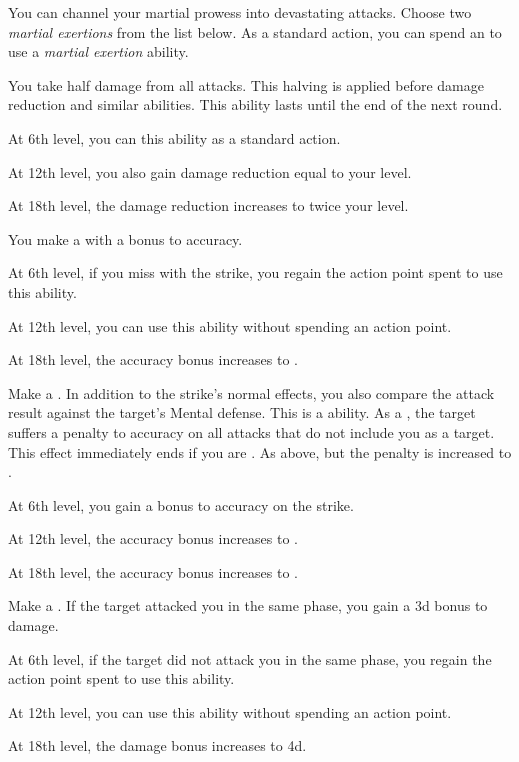         You can channel your martial prowess into devastating attacks.
        Choose two \textit{martial exertions} from the list below.
        As a standard action, you can spend an  to use a \textit{martial exertion} ability.
        {
             You take half damage from all attacks.
            This halving is applied before damage reduction and similar abilities.
            This ability lasts until the end of the next round.
            \par At 6th level, you can  this ability as a standard action.
            \par At 12th level, you also gain damage reduction equal to your level.
            \par At 18th level, the damage reduction increases to twice your level.

             You make a  with a  bonus to accuracy.
            \par At 6th level, if you miss with the strike, you regain the action point spent to use this ability.
            \par At 12th level, you can use this ability without spending an action point.
            \par At 18th level, the accuracy bonus increases to .

             Make a .
            In addition to the strike's normal effects, you also compare the attack result against the target's Mental defense.
            This is a  ability.
             As a , the target suffers a  penalty to accuracy on all attacks that do not include you as a target.
            This effect immediately ends if you are .
             As above, but the penalty is increased to .
            \par At 6th level, you gain a  bonus to accuracy on the strike.
            \par At 12th level, the accuracy bonus increases to .
            \par At 18th level, the accuracy bonus increases to .

             Make a .
            If the target attacked you in the same phase, you gain a \plus3d bonus to damage.
            \par At 6th level, if the target did not attack you in the same phase, you regain the action point spent to use this ability.
            \par At 12th level, you can use this ability without spending an action point.
            \par At 18th level, the damage bonus increases to \plus4d.

}
